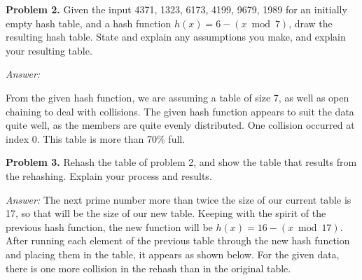 \documentclass[11pt]{article}
\begin{document}
\vspace{22pt}

\textbf{Problem 2.} Given the input 4371, 1323, 6173, 4199, 9679, 1989
for an initially empty hash table, and a hash function 
$h(x) = 6 - (x \bmod 7)$, draw the resulting hash table. State and
explain any assumptions you make, and explain your resulting table.

\textit{Answer:}

\begin{center}
\end{center}

From the given hash function, we are assuming a table of size 7, as well as 
open chaining to deal with collisions. The given hash function appears to 
suit the data quite well, as the members are quite evenly distributed. One 
collision occurred at index 0. This table is more than 70\% full.

\clearpage

\textbf{Problem 3.} Rehash the table of problem 2, and show the table that 
results from the rehashing. Explain your process and results.

\textit{Answer:} The next prime number more than twice the size of our 
current table is 17, so that will be the size of our new table. Keeping with 
the spirit of the previous hash function, the new function will be 
$h(x) = 16 - (x \bmod 17)$. After running each element of the previous 
table through the new hash function and placing them in the table, it appears 
as shown below. For the given data, there is one more collision in the rehash 
than in the original table.
\end{document}
